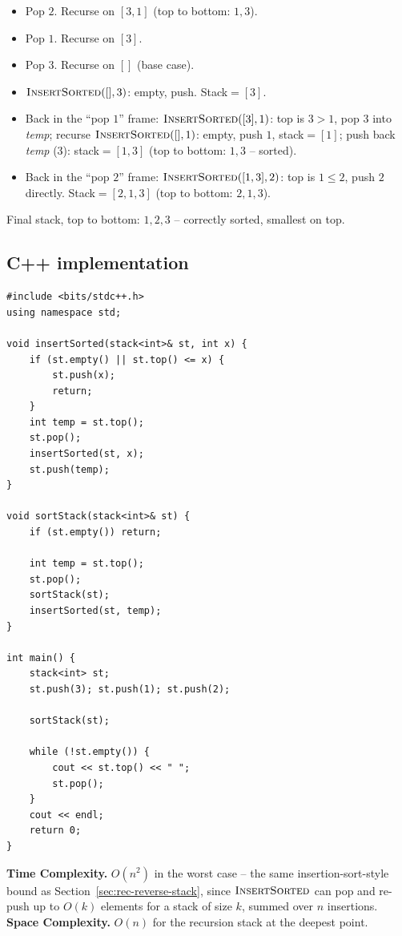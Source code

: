 \begin{itemize}
  \item Pop $2$. Recurse on $[3,1]$ (top to bottom: $1,3$).
  \item Pop $1$. Recurse on $[3]$.
  \item Pop $3$. Recurse on $[]$ (base case).
  \item $\textsc{InsertSorted}([], 3)$: empty, push. Stack$=[3]$.
  \item Back in the ``pop $1$'' frame: $\textsc{InsertSorted}([3], 1)$:
        top is $3 > 1$, pop $3$ into \textit{temp}; recurse
        $\textsc{InsertSorted}([], 1)$: empty, push $1$, stack$=[1]$;
        push back \textit{temp} ($3$): stack$=[1,3]$ (top to bottom:
        $1,3$ -- sorted).
  \item Back in the ``pop $2$'' frame: $\textsc{InsertSorted}([1,3],
        2)$: top is $1 \le 2$, push $2$ directly. Stack$=[2,1,3]$ (top
        to bottom: $2,1,3$).
\end{itemize}

Final stack, top to bottom: $1,2,3$ -- correctly sorted, smallest on
top.

\subsection*{C++ implementation}

\begin{lstlisting}
#include <bits/stdc++.h>
using namespace std;

void insertSorted(stack<int>& st, int x) {
    if (st.empty() || st.top() <= x) {
        st.push(x);
        return;
    }
    int temp = st.top();
    st.pop();
    insertSorted(st, x);
    st.push(temp);
}

void sortStack(stack<int>& st) {
    if (st.empty()) return;

    int temp = st.top();
    st.pop();
    sortStack(st);
    insertSorted(st, temp);
}

int main() {
    stack<int> st;
    st.push(3); st.push(1); st.push(2);

    sortStack(st);

    while (!st.empty()) {
        cout << st.top() << " ";
        st.pop();
    }
    cout << endl;
    return 0;
}
\end{lstlisting}

\begin{complexitybox}
\textbf{Time Complexity.} $O(n^2)$ in the worst case -- the same
insertion-sort-style bound as Section~\ref{sec:rec-reverse-stack}, since
$\textsc{InsertSorted}$ can pop and re-push up to $O(k)$ elements for a
stack of size $k$, summed over $n$ insertions.
\textbf{Space Complexity.} $O(n)$ for the recursion stack at the deepest
point.
\end{complexitybox}

